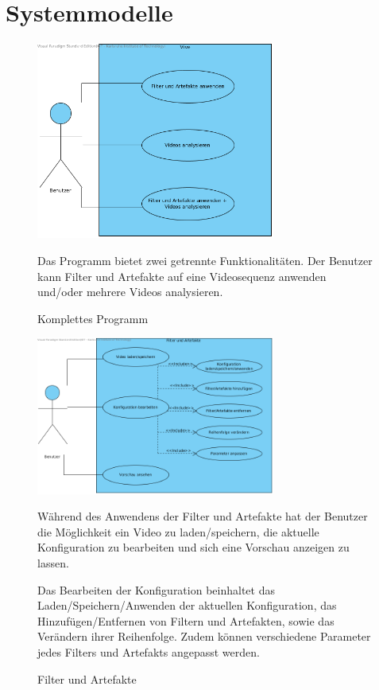 \documentclass[parskip=full]{scrartcl}
\begin{document}
\section{Systemmodelle}
\begin{figure}[htbp]
{\centering 
\includegraphics[width=0.7\textwidth]{UsecaseDiagrams/UseCaseDiagram1.png}
\caption{Komplettes Programm} }

Das Programm bietet zwei getrennte Funktionalitäten. Der Benutzer kann Filter und Artefakte auf eine Videosequenz anwenden und/oder mehrere Videos analysieren.

\end{figure}
\begin{figure}[htbp]
{\centering
\includegraphics[width=0.7\textwidth]{UsecaseDiagrams/FilterundArtefakteanwenden.png}
\caption{Filter und Artefakte} }

Während des Anwendens der Filter und Artefakte hat der Benutzer die Möglichkeit ein Video zu laden/speichern, die aktuelle Konfiguration zu bearbeiten und sich eine Vorschau anzeigen zu lassen. 

Das Bearbeiten der Konfiguration beinhaltet das Laden/Speichern/Anwenden der aktuellen Konfiguration, das Hinzufügen/Entfernen von Filtern und Artefakten, sowie das Verändern ihrer Reihenfolge. Zudem können verschiedene Parameter jedes Filters und Artefakts angepasst werden.

\end{figure}
\end{document}

